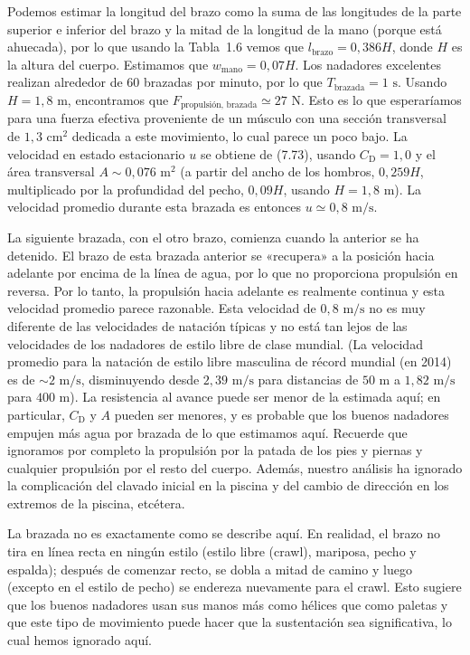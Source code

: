 \documentclass[12pt]{book}
\begin{document}
Podemos estimar la longitud del brazo como la suma de las longitudes de la parte superior e inferior del brazo y la mitad de la longitud de la mano (porque está ahuecada), por lo que usando la Tabla~1.6 vemos que $l_{\text{brazo}} = 0{,}386H$, donde $H$ es la altura del cuerpo. Estimamos que $w_{\text{mano}} = 0{,}07H$. Los nadadores excelentes realizan alrededor de $60$ brazadas por minuto, por lo que $T_{\text{brazada}} = 1\text{ s}$. Usando $H = 1{,}8\text{ m}$, encontramos que $F_{\text{propulsión, brazada}} \simeq 27\text{ N}$. Esto es lo que esperaríamos para una fuerza efectiva proveniente de un músculo con una sección transversal de $1{,}3\text{ cm}^2$ dedicada a este movimiento, lo cual parece un poco bajo. La velocidad en estado estacionario $u$ se obtiene de (7.73), usando $C_{\text{D}} = 1{,}0$ y el área transversal $A \sim 0{,}076\text{ m}^2$ (a partir del ancho de los hombros, $0{,}259H$, multiplicado por la profundidad del pecho, $0{,}09H$, usando $H = 1{,}8\text{ m}$). La velocidad promedio durante esta brazada es entonces $u \simeq 0{,}8\text{ m/s}$.

La siguiente brazada, con el otro brazo, comienza cuando la anterior se ha detenido. El brazo de esta brazada anterior se «recupera» a la posición hacia adelante por encima de la línea de agua, por lo que no proporciona propulsión en reversa. Por lo tanto, la propulsión hacia adelante es realmente continua y esta velocidad promedio parece razonable. Esta velocidad de $0{,}8\text{ m/s}$ no es muy diferente de las velocidades de natación típicas y no está tan lejos de las velocidades de los nadadores de estilo libre de clase mundial. (La velocidad promedio para la natación de estilo libre masculina de récord mundial (en 2014) es de ${\sim}2\text{ m/s}$, disminuyendo desde $2{,}39\text{ m/s}$ para distancias de $50\text{ m}$ a $1{,}82\text{ m/s}$ para $400\text{ m}$). La resistencia al avance puede ser menor de la estimada aquí; en particular, $C_{\text{D}}$ y $A$ pueden ser menores, y es probable que los buenos nadadores empujen más agua por brazada de lo que estimamos aquí. Recuerde que ignoramos por completo la propulsión por la patada de los pies y piernas y cualquier propulsión por el resto del cuerpo. Además, nuestro análisis ha ignorado la complicación del clavado inicial en la piscina y del cambio de dirección en los extremos de la piscina, etcétera.

La brazada no es exactamente como se describe aquí. En realidad, el brazo no tira en línea recta en ningún estilo (estilo libre (crawl), mariposa, pecho y espalda); después de comenzar recto, se dobla a mitad de camino y luego (excepto en el estilo de pecho) se endereza nuevamente para el crawl. Esto sugiere que los buenos nadadores usan sus manos más como hélices que como paletas y que este tipo de movimiento puede hacer que la sustentación sea significativa, lo cual hemos ignorado aquí.
\end{document}
